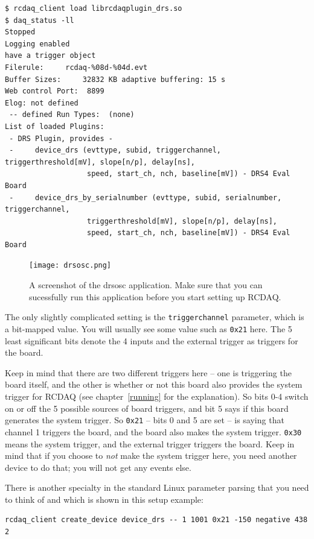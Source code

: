 \documentclass{article}[11pt]
\begin{document}
{\footnotesize 
\begin{verbatim}
$ rcdaq_client load librcdaqplugin_drs.so
$ daq_status -ll
Stopped
Logging enabled
have a trigger object
Filerule:     rcdaq-%08d-%04d.evt
Buffer Sizes:     32832 KB adaptive buffering: 15 s
Web control Port:  8899
Elog: not defined
 -- defined Run Types:  (none)
List of loaded Plugins:
 - DRS Plugin, provides -
 -     device_drs (evttype, subid, triggerchannel, triggerthreshold[mV], slope[n/p], delay[ns], 
                   speed, start_ch, nch, baseline[mV]) - DRS4 Eval Board
 -     device_drs_by_serialnumber (evttype, subid, serialnumber, triggerchannel, 
                   triggerthreshold[mV], slope[n/p], delay[ns], 
                   speed, start_ch, nch, baseline[mV]) - DRS4 Eval Board
\end{verbatim}
}

\begin{figure}
  \centering
  \texttt{[image: drsosc.png]}
  \caption{\label{drsosc}A screenshot of the drsosc application. Make
    sure that you can sucessfully run this application before you
    start setting up RCDAQ.}
\end{figure}

The only slightly complicated setting is the \verb|triggerchannel|
parameter, which is a bit-mapped value. You will usually see some
value such as \verb|0x21| here. The 5 least significant bits denote
the 4 inputs and the external trigger as triggers for the board.

Keep in mind that there are two different triggers here -- one is
triggering the board itself, and the other is whether or not this
board also provides the system trigger for RCDAQ (see
chapter~\ref{running} for the explanation). So bits 0-4 switch on or
off the 5 possible sources of board triggers, and bit 5 says if this
board generates the system trigger. So \verb|0x21| -- bits 0 and 5 are
set -- is saying that channel 1 triggers the board, and the board also
makes the system trigger. \verb|0x30| means the system trigger, and
the external trigger triggers the board. Keep in mind that if you
choose to \emph{not} make the system trigger here, you need another
device to do that; you will not get any events else.

There is another specialty in the standard Linux parameter
parsing that you need to think of and which is shown in this setup
example:

\begin{verbatim}
rcdaq_client create_device device_drs -- 1 1001 0x21 -150 negative 438 2
\end{verbatim}
\end{document}

